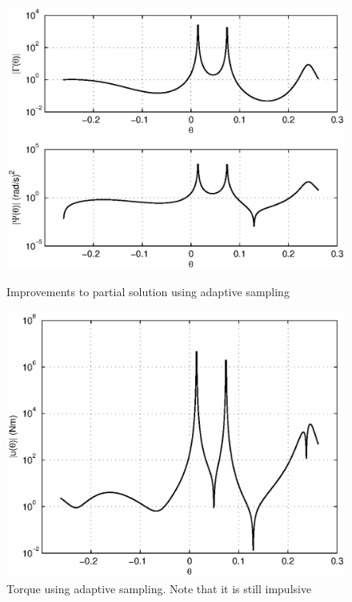 \begin{figure}
	\begin{minipage}{0.48\textwidth}
		\centering
		\includegraphics[width=\linewidth]{4VirtConstLib/betterGamPsi}
		\caption{Improvements to partial solution using adaptive sampling}
		\label{fig:betterGamPsi}
	\end{minipage}
	\hfill
 	\begin{minipage}{0.48\textwidth}
 		\centering
	 	\includegraphics[width=\linewidth]{4VirtConstLib/betterTorque}
	 	\caption[Torque using adaptive sampling]{Torque using adaptive sampling. Note that it is still impulsive}
	 	\label{fig:bettertorque}
 	\end{minipage}
\end{figure}
  
